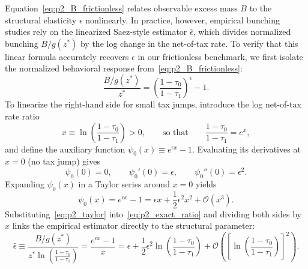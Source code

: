 Equation~\eqref{eq:p2_B_frictionless} relates observable excess mass $B$ to the structural elasticity $\epsilon$ nonlinearly. In practice, however, empirical bunching studies rely on the linearized Saez-style estimator $\hat{\epsilon}$, which divides normalized bunching $B/g(z^*)$ by the log change in the net-of-tax rate. To verify that this linear formula accurately recovers $\epsilon$ in our frictionless benchmark, we first isolate the normalized behavioral  response from~\eqref{eq:p2_B_frictionless}:
\begin{equation}
\frac{B / g(z^*)}{z^*} = \left(\frac{1-\tau_0}{1-\tau_1}\right)^\epsilon - 1.
\label{eq:p2_exact_ratio}
\end{equation}
To linearize the right-hand side for small tax jumps, introduce the log net-of-tax rate ratio
\begin{equation}
x \equiv \ln\!\left(\frac{1-\tau_0}{1-\tau_1}\right) > 0,
\qquad \text{so that} \qquad
\frac{1-\tau_0}{1-\tau_1} = e^x,
\end{equation}
and define the auxiliary function $\psi_0(x) \equiv e^{\epsilon x} - 1$. Evaluating its derivatives at $x = 0$ (no tax jump) gives
\begin{equation}
\psi_0(0) = 0, \qquad
\psi_0'(0) = \epsilon, \qquad
\psi_0''(0) = \epsilon^2.
\end{equation}
Expanding $\psi_0(x)$ in a Taylor series around $x = 0$ yields
\begin{equation}
\psi_0(x) = e^{\epsilon x} - 1 = \epsilon x + \frac{1}{2}\epsilon^2 x^2 + \mathcal{O}(x^3).
\label{eq:p2_taylor}
\end{equation}
Substituting~\eqref{eq:p2_taylor} into~\eqref{eq:p2_exact_ratio} and dividing both sides by $x$ links the empirical estimator directly to the structural parameter:
\begin{equation}
\hat{\epsilon} \equiv \frac{B / g(z^*)}{z^*\ln\!\left(\frac{1-\tau_0}{1-\tau_1}\right)}
= \frac{e^{\epsilon x} - 1}{x}
= \epsilon + \frac{1}{2}\epsilon^2 \ln\!\left(\frac{1-\tau_0}{1-\tau_1}\right) + \mathcal{O}\!\left(\left[\ln\!\left(\frac{1-\tau_0}{1-\tau_1}\right)\right]^2\right).
\label{eq:p2_eps_hat_taylor}
\end{equation}
